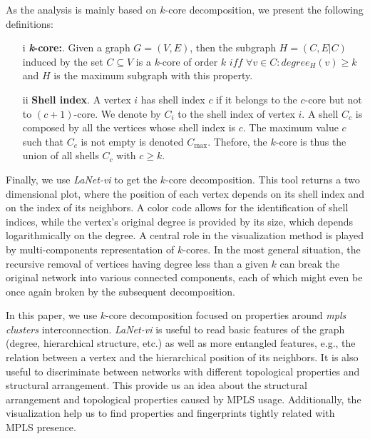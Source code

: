 As the analysis is mainly based on $k$-core decomposition, we present the following definitions:
 

\begin{itemize}
\item[i]{\textbf{\textit{k}-core:}}. Given a graph $G=(V,E)$, then the subgraph $H=(C,E|C)$ induced by the set $ C\subseteq V$ is a \textit{k}-core of order $k$ $iff$ $\forall v \in C: degree_{H}(v)\geq k$ and $H$ is the maximum subgraph with this property.

\item[ii]\textbf{Shell index}. A vertex $i$ has shell index $c$ if it belongs to the $c$-core but not to $(c+1)$-core. 
We denote by $C_i$ to the shell index of vertex $i$. A shell $C_c$ is composed by all the vertices whose shell index is $c$. The maximum value $c$ such that $C_c$ is not empty is denoted $C_{\max}$. 
Thefore, the $k$-core is thus the union of all shells $C_c$ with $c \geq k$.
\end{itemize}

Finally, we use  \textit{LaNet-vi} \cite{Alvarez06k} to get the $k$-core decomposition. 
This tool returns a two dimensional plot, where the position of each vertex depends on its shell index and on the index of its neighbors. 
A color code allows for the identification of shell indices, while the vertex's original degree is provided by its size, which depends logarithmically on the degree.
A central role in the visualization method is played by multi-components representation of $k$-cores. 
In the most general situation, the recursive removal of vertices having degree less than a given $k$ can break the original network into various connected components, each of which might even be once again broken by the subsequent decomposition.

In this paper, we use $k$-core decomposition focused on properties around \textit{mpls clusters} interconnection. 
 \textit{LaNet-vi} is useful to read basic features of the graph (degree, hierarchical structure, etc.) as well as more entangled features, e.g., the relation between a vertex and the hierarchical position of its neighbors. 
It is also useful to  discriminate between networks with different topological properties and structural arrangement.
This provide us an idea about the structural arrangement and topological properties caused by MPLS usage. 
Additionally,  the visualization help us to find properties and fingerprints tightly related with MPLS presence.


